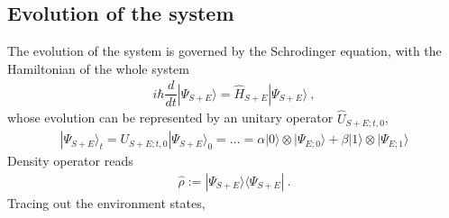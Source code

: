 \documentclass[letterpaper,10pt,english]{jupyterBook}
\begin{document}
\subsection{Evolution of the system}
\label{\detokenize{ch/quantum-mechanics/decoherence:evolution-of-the-system}}\label{\detokenize{ch/quantum-mechanics/decoherence:quantum-mechanics-decoherence-example-evolution}}
\sphinxAtStartPar
The evolution of the system is governed by the Schrodinger equation, with the Hamiltonian of the whole system
\begin{equation*}
\begin{split}i \hbar \dfrac{d}{dt} | \Psi_{S+E} \rangle = \hat{H}_{S+E} | \Psi_{S+E} \rangle \ ,\end{split}
\end{equation*}
\sphinxAtStartPar
whose evolution can be represented by an unitary operator \(\hat{U}_{S+E; t,0}\),
\begin{equation*}
\begin{split}| \Psi_{S+E} \rangle_t = U_{S+E; t,0} | \Psi_{S+E} \rangle_0  = \dots = \alpha | 0 \rangle \otimes | \Psi_{E;0} \rangle + \beta | 1 \rangle \otimes | \Psi_{E;1} \rangle\end{split}
\end{equation*}
\sphinxAtStartPar
Density operator reads
\begin{equation*}
\begin{split}\hat{\rho} := | \Psi_{S+E} \rangle \langle \Psi_{S+E} | \ .\end{split}
\end{equation*}
\sphinxAtStartPar
Tracing out the environment states,
\end{document}
